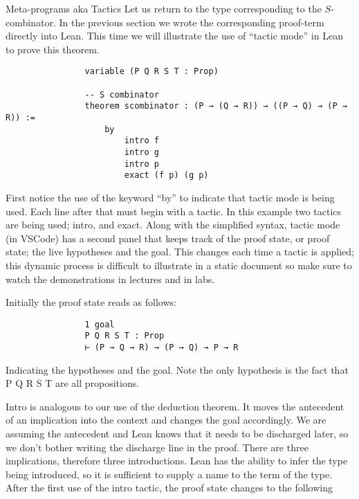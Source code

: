 \documentclass{book}
\begin{document}
    \begin{eg}{Meta-programs aka Tactics}
        Let us return to the type corresponding to the $S$-combinator. In the previous section we wrote the corresponding proof-term directly into Lean. This time we will illustrate the use of ``tactic mode'' in Lean to prove this theorem. 
        
        \begin{center}
            \begin{lstlisting}
                variable (P Q R S T : Prop)

                -- S combinator
                theorem scombinator : (P → (Q → R)) → ((P → Q) → (P → R)) :=
                    by
                        intro f 
                        intro g 
                        intro p
                        exact (f p) (g p)
            \end{lstlisting}
        \end{center}

        First notice the use of the keyword ``by'' to indicate that tactic mode is being used. Each line after that must begin with a tactic. In this example two tactics are being used; intro, and exact. Along with the simplified syntax, tactic mode (in VSCode) has a second panel that keeps track of the proof state, or proof state; the live hypotheses and the goal. This changes each time a tactic is applied; this dynamic process is difficult to illustrate in a static document so make sure to watch the demonstrations in lectures and in labs. 

        Initially the proof state reads as follows: 

        \begin{center}
            \begin{lstlisting}
                1 goal
                P Q R S T : Prop
                ⊢ (P → Q → R) → (P → Q) → P → R
            \end{lstlisting}
        \end{center}

        Indicating the hypotheses and the goal. Note the only hypothesis is the fact that P Q R S T are all propositions. 

        Intro is analogous to our use of the deduction theorem. It moves the antecedent of an implication into the context and changes the goal accordingly. We are assuming the antecedent and Lean knows that it needs to be discharged later, so we don't bother writing the discharge line in the proof. There are three implications, therefore three introductions. Lean has the ability to infer the type being introduced, so it is sufficient to supply a name to the term of the type. After the first use of the intro tactic, the proof state changes to the following


\end{eg}
\end{document}
